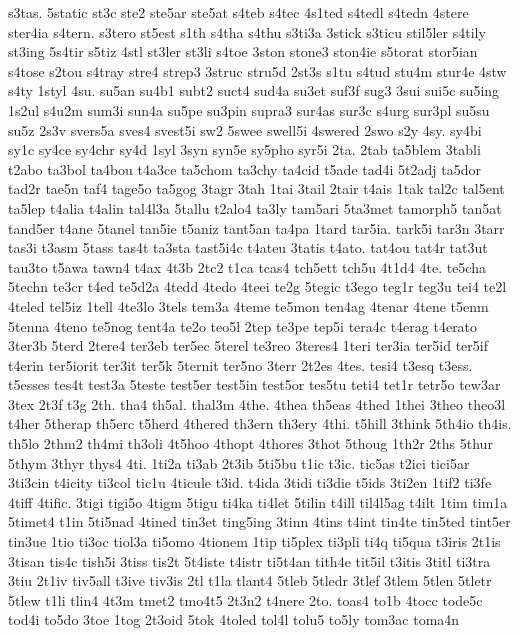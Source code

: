 {s3tas.
5static
st3c
ste2
ste5ar
ste5at
s4teb
s4tec
4s1ted
s4tedl
s4tedn
4stere
ster4ia
s4tern.
s3tero
st5est
s1th
s4tha
s4thu
s3ti3a
3stick
s3ticu
stil5ler
s4tily
st3ing
5s4tir
s5tiz
4stl
st3ler
st3li
s4toe
3ston
stone3
ston4ie
s5torat
stor5ian
s4tose
s2tou
s4tray
stre4
strep3
3struc
stru5d
2st3s
s1tu
s4tud
stu4m
stur4e
4stw
s4ty
1styl
4su.
su5an
su4b1
subt2
suct4
sud4a
su3et
suf3f
sug3
3sui
sui5c
su5ing
1s2ul
s4u2m
sum3i
sun4a
su5pe
su3pin
supra3
sur4as
sur3c
s4urg
sur3pl
su5su
su5z
2s3v
svers5a
sves4
svest5i
sw2
5swee
swell5i
4swered
2swo
s2y
4sy.
sy4bi
sy1c
sy4ce
sy4chr
sy4d
1syl
3syn
syn5e
sy5pho
syr5i
2ta.
2tab
ta5blem
3tabli
t2abo
ta3bol
ta4bou
t4a3ce
ta5chom
ta3chy
ta4cid
t5ade
tad4i
5t2adj
ta5dor
tad2r
tae5n
taf4
tage5o
ta5gog
3tagr
3tah
1tai
3tail
2tair
t4ais
1tak
tal2c
tal5ent
ta5lep
t4alia
t4alin
tal4l3a
5tallu
t2alo4
ta3ly
tam5ari
5ta3met
tamorph5
tan5at
tand5er
t4ane
5tanel
tan5ie
t5aniz
tant5an
ta4pa
1tard
tar5ia.
tark5i
tar3n
3tarr
tas3i
t3asm
5tass
tas4t
ta3sta
tast5i4c
t4ateu
3tatis
t4ato.
tat4ou
tat4r
tat3ut
tau3to
t5awa
tawn4
t4ax
4t3b
2tc2
t1ca
tcas4
tch5ett
tch5u
4t1d4
4te.
te5cha
5techn
te3cr
t4ed
te5d2a
4tedd
4tedo
4teei
te2g
5tegic
t3ego
teg1r
teg3u
tei4
te2l
4teled
tel5iz
1tell
4te3lo
3tels
tem3a
4teme
te5mon
ten4ag
4tenar
4tene
t5enm
5tenna
4teno
te5nog
tent4a
te2o
teo5l
2tep
te3pe
tep5i
tera4c
t4erag
t4erato
3ter3b
5terd
2tere4
ter3eb
ter5ec
5terel
te3reo
3teres4
1teri
ter3ia
ter5id
ter5if
t4erin
ter5iorit
ter3it
ter5k
5ternit
ter5no
3terr
2t2es
4tes.
tesi4
t3esq
t3ess.
t5esses
tes4t
test3a
5teste
test5er
test5in
test5or
tes5tu
teti4
tet1r
tetr5o
tew3ar
3tex
2t3f
t3g
2th.
tha4
th5al.
thal3m
4the.
4thea
th5eas
4thed
1thei
3theo
theo3l
t4her
5therap
th5erc
t5herd
4thered
th3ern
th3ery
4thi.
t5hill
3think
5th4io
th4is.
th5lo
2thm2
th4mi
th3oli
4t5hoo
4thopt
4thores
3thot
5thoug
1th2r
2ths
5thur
5thym
3thyr
thys4
4ti.
1ti2a
ti3ab
2t3ib
5ti5bu
t1ic
t3ic.
tic5as
t2ici
tici5ar
3ti3cin
t4icity
ti3col
tic1u
4ticule
t3id.
t4ida
3tidi
ti3die
t5ids
3ti2en
1tif2
ti3fe
4tiff
4tific.
3tigi
tigi5o
4tigm
5tigu
ti4ka
ti4let
5tilin
t4ill
til4l5ag
t4ilt
1tim
tim1a
5timet4
t1in
5ti5nad
4tined
tin3et
ting5ing
3tinn
4tins
t4int
tin4te
tin5ted
tint5er
tin3ue
1tio
ti3oc
tiol3a
ti5omo
4tionem
1tip
ti5plex
ti3pli
ti4q
ti5qua
t3iris
2t1is
3tisan
tis4c
tish5i
3tiss
tis2t
5t4iste
t4istr
ti5t4an
tith4e
tit5il
t3itis
3titl
ti3tra
3tiu
2t1iv
tiv5all
t3ive
tiv3is
2tl
t1la
tlant4
5tleb
5tledr
3tlef
3tlem
5tlen
5tletr
5tlew
t1li
tlin4
4t3m
tmet2
tmo4t5
2t3n2
t4nere
2to.
toas4
to1b
4tocc
tode5c
tod4i
to5do
3toe
1tog
2t3oid
5tok
4toled
tol4l
tolu5
to5ly
tom3ac
toma4n
}
